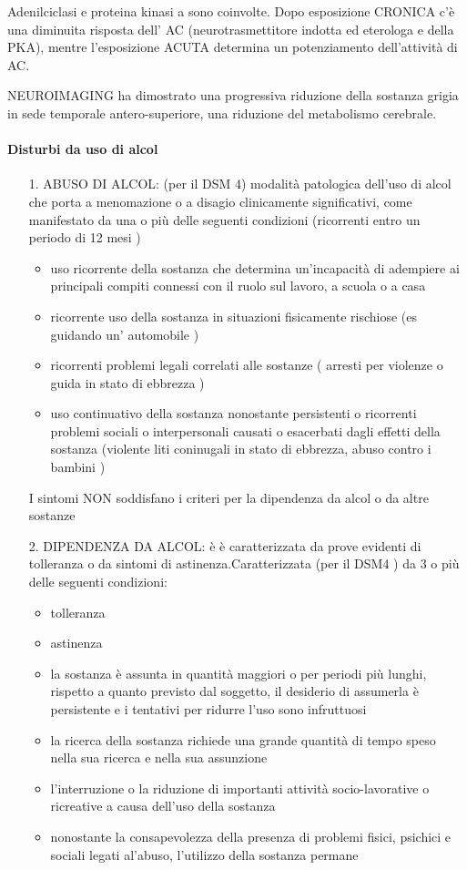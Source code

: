 Adenilciclasi e proteina kinasi a sono coinvolte. Dopo esposizione
CRONICA c'è una diminuita risposta dell' AC (neurotrasmettitore indotta
ed eterologa e della PKA), mentre l'esposizione ACUTA determina un
potenziamento dell'attività di AC.

NEUROIMAGING ha dimostrato una progressiva riduzione della sostanza
grigia in sede temporale antero-superiore, una riduzione del metabolismo
cerebrale.

\paragraph{Disturbi da uso di alcol}

\begin{itemize}
\item[1.] ABUSO DI ALCOL: (per il DSM 4) modalità patologica dell'uso di alcol
che porta a menomazione o a disagio clinicamente significativi, come
manifestato da una o più delle seguenti condizioni (ricorrenti entro un
periodo di 12 mesi )
\begin{itemize}
\item uso ricorrente della sostanza che determina un'incapacità di adempiere
ai principali compiti connessi con il ruolo sul lavoro, a scuola o a
casa
\item ricorrente uso della sostanza in situazioni fisicamente rischiose (es
guidando un' automobile )
\item ricorrenti problemi legali correlati alle sostanze ( arresti per
violenze o guida in stato di ebbrezza )
\item uso continuativo della sostanza nonostante persistenti o ricorrenti
problemi sociali o interpersonali causati o esacerbati dagli effetti
della sostanza (violente liti coninugali in stato di ebbrezza, abuso
contro i bambini )
\end{itemize}
I sintomi NON soddisfano i criteri per la dipendenza da alcol o da altre
sostanze
\item[2.] DIPENDENZA DA ALCOL: è è caratterizzata da prove evidenti di
tolleranza o da sintomi di astinenza.Caratterizzata (per il DSM4 ) da 3
o più delle seguenti condizioni:
\begin{itemize}
\item tolleranza
\item astinenza
\item la sostanza è assunta in quantità maggiori o per periodi più lunghi,
rispetto a quanto previsto dal soggetto, il desiderio di assumerla è
persistente e i tentativi per ridurre l'uso sono infruttuosi
\item la ricerca della sostanza richiede una grande quantità di tempo speso
nella sua ricerca e nella sua assunzione
\item l'interruzione o la riduzione di importanti attività socio-lavorative
o ricreative a causa dell'uso della sostanza
\item nonostante la consapevolezza della presenza di problemi fisici,
psichici e sociali legati al'abuso, l'utilizzo della sostanza permane
\end{itemize}
\end{itemize}
